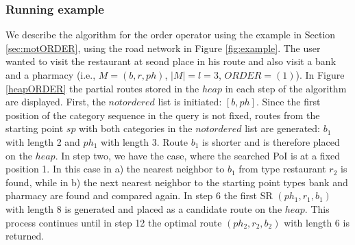 \subsubsection{Running example}
We describe the algorithm for the order operator using the example in Section \ref{sec:motORDER}, using the road network in Figure \ref{fig:example}. The user wanted to visit the restaurant at seond place in his route and also visit a bank and a pharmacy (i.e., $M = (b, r, ph)$, $|M| = l = 3$, $ORDER = (1)$). In Figure \ref{heapORDER} the partial routes stored in the $heap$ in each step of the algorithm are displayed.
First, the $notordered$ list is initiated: $[b, ph]$. Since the first position of the category sequence in the query is not fixed, routes from the starting point $sp$ with both categories in the $notordered$ list are generated: $b_1$ with length 2 and $ph_1$ with length 3. Route $b_1$ is shorter and is therefore placed on the $heap$. In step two, we have the case, where the searched PoI is at a fixed position 1. In this case in a) the nearest neighbor to $b_1$ from type restaurant $r_2$ is found, while in b) the next nearest neighbor to the starting point types bank and pharmacy are found and compared again. In step 6 the first SR $(ph_1, r_1, b_1)$ with length 8 is generated and placed as a candidate route on the $heap$.
This process continues until in step 12 the optimal route $(ph_2, r_2, b_2)$ with length 6 is returned.

